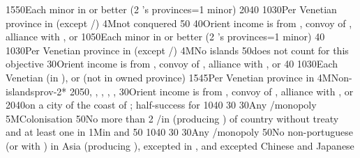%
%
{15}{50}{Each minor in \EG or better (2 's provinces=1 minor)}%
%
%
{20}{40}{}%
%
%
{10}{30}{Per Venetian province in \regionBalkans (except
  \provinceHellas/\provinceMoreas)}%
%
\EUobjective4M{\paysmamelouks not conquered}{}%
{}{50}{}%
%
%
{}{40}{Orient income is from , convoy of \villeIzmir,
  alliance with \paysaden, \paysoman or \paysgujarat}%
%
%
%
{10}{50}{Each minor in \EG or better (2 's provinces=1 minor)}%
%
%
{}{40}{}%
%
%
{10}{30}{Per Venetian province in \regionBalkans (except
  \provinceHellas/\provinceMoreas)}%
%
\EUobjective4M{No \TUR islands}{}%
{}{50}{\provinceRhodos does not count for this objective}%
%
%
{}{30}{Orient income is from , convoy of \villeIzmir,
  alliance with \paysaden, \paysoman or \paysgujarat}%
%
%
%
{}{40}{}%
%
%
{10}{30}{Each Venetian \Presidio (in ), or \regionBalkans
  (not in owned province)}%
%
%
{15}{45}{Per Venetian province in \regionBalkans}%
%
\EUobjective4M{Non-\TUR islands}{prov-2*}%
{20}{50}{\provinceChypre, \provinceKreta, \provinceCyclades, \provinceCorfu,
  \provinceMalta, \provinceRhodos}%
%
%
%
{}{30}{Orient income is from , convoy of \villeIzmir,
  alliance with \paysaden, \paysoman or \paysgujarat}%
%
 
%
%
{20}{40}{\COL on a city of the coast of \continentIndia; half-success for
  \granderegionCeylan}%
%
%
{10}{40}{}%
%
%
{}{30}{}%
%
%
{}{30}{Any \CTZ/\STZ monopoly}%
%
\EUobjective5M{Colonisation}{}%
{}{50}{No more than 2 \COL/\TP in \continentAsia (producing \POSPICE) of
  country without treaty and at least one \COL in \continentBrazil}%
%
%
%
\EUobjective1M{\TP in \payschine and \paysjapon}{}%
{}{50}{}%
%
%
{10}{40}{}%
%
%
{}{30}{}%
%
%
{}{30}{Any \CTZ/\STZ monopoly}%
%
%
{}{50}{No non-portuguese \TP (or with \dipAT) in Asia (producing \POSPICE),
  excepted in , and excepted Chinese and Japanese
  \TP}%

